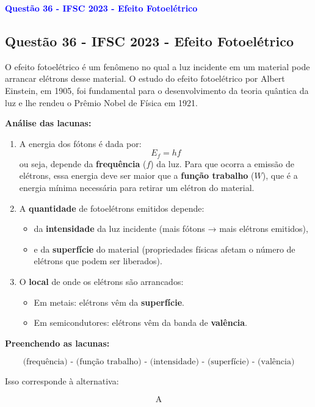 \begin{flushleft}
\textbf{\textcolor{blue}{\Large Quest\~ao 36 - IFSC 2023 - Efeito Fotoelétrico}}\\
\noindent

\subsection{Quest\~ao 36 - IFSC 2023 - Efeito Fotoelétrico}
O efeito fotoelétrico é um fenômeno no qual a luz incidente em um material pode arrancar 
elétrons desse material. O estudo do efeito fotoelétrico por Albert Einstein, em 1905, foi 
fundamental para o desenvolvimento da teoria quântica da luz e lhe rendeu o Prêmio Nobel de Física em 1921.

\textbf{Análise das lacunas:}

\begin{enumerate}
    \item A energia dos fótons é dada por:
    \[
    E_f = h f
    \]
    ou seja, depende da \textbf{frequência} (\(f\)) da luz.  
    Para que ocorra a emissão de elétrons, essa energia deve ser maior que a \textbf{função trabalho} (\(W\)), que é a energia mínima necessária para retirar um elétron do material.

    \item A \textbf{quantidade} de fotoelétrons emitidos depende:
    \begin{itemize}
        \item da \textbf{intensidade} da luz incidente (mais fótons → mais elétrons emitidos),
        \item e da \textbf{superfície} do material (propriedades físicas afetam o número de elétrons que podem ser liberados).
    \end{itemize}

    \item O \textbf{local} de onde os elétrons são arrancados:
    \begin{itemize}
        \item Em metais: elétrons vêm da \textbf{superfície}.
        \item Em semicondutores: elétrons vêm da banda de \textbf{valência}.
    \end{itemize}
\end{enumerate}

\textbf{Preenchendo as lacunas:}

\[
\text{(frequência) - (função trabalho) - (intensidade) - (superfície) - (valência)}
\]

Isso corresponde à alternativa:

\[
\boxed{\text{A}}
\]

\end{flushleft}

